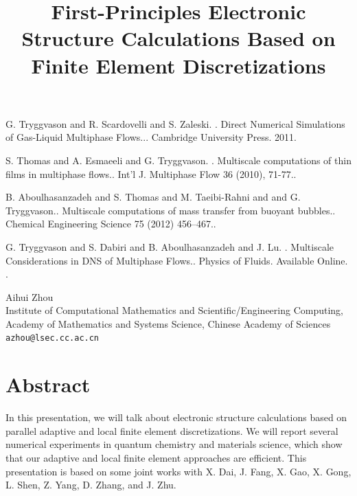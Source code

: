\documentclass[article, A4, 11pt]{llncs}%
\begin{document}


\begin{thebibliography}{10}
{\sc G. Tryggvason and R. Scardovelli and S. Zaleski. }. {Direct Numerical Simulations of Gas-Liquid Multiphase Flows..}. Cambridge University Press. 2011.

{\sc S. Thomas and A. Esmaeeli and G. Tryggvason. }. {Multiscale computations of thin films in multiphase flows.}. Int'l J. Multiphase Flow 36 (2010), 71-77..

{\sc B. Aboulhasanzadeh and S. Thomas and M. Taeibi-Rahni and and G. Tryggvason.}. {Multiscale computations of mass transfer from buoyant bubbles.}. Chemical Engineering Science 75 (2012) 456–467..

{\sc G. Tryggvason and S. Dabiri and B. Aboulhasanzadeh and J. Lu. }. {Multiscale Considerations in DNS of Multiphase Flows.}. Physics of Fluids. Available Online. .
\end{thebibliography} %

\title{First-Principles Electronic Structure Calculations Based on Finite Element Discretizations}
 \author{} \institute{}
\maketitle
\begin{center}
{\large Aihui Zhou}\\
Institute of Computational Mathematics and Scientific/Engineering Computing, Academy of Mathematics and Systems Science, Chinese Academy of Sciences\\
{\tt azhou@lsec.cc.ac.cn}
\end{center}

\section*{Abstract}
In this presentation, we will talk about
electronic structure calculations based on parallel adaptive and local finite
element discretizations. We will report several numerical
experiments in quantum chemistry and materials science, which show that our adaptive and
local finite element approaches are efficient. This presentation is
based on some joint works with X. Dai, J. Fang, X. Gao, X. Gong, L. Shen, Z. Yang,
D. Zhang, and J. Zhu.
\end{document}
